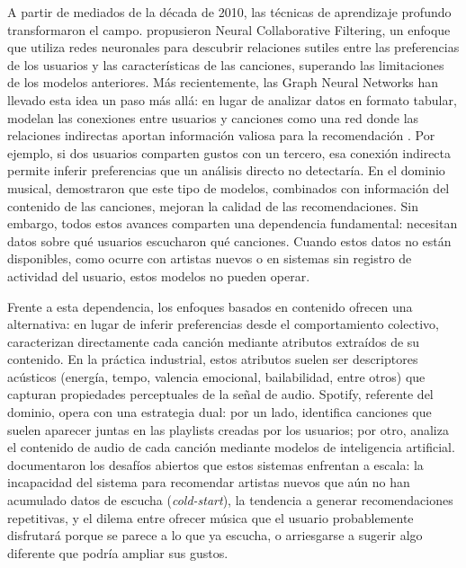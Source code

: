 A partir de mediados de la década de 2010, las técnicas de aprendizaje profundo transformaron el campo. \textcite{he_2017_ncf} propusieron Neural Collaborative Filtering, un enfoque que utiliza redes neuronales para descubrir relaciones sutiles entre las preferencias de los usuarios y las características de las canciones, superando las limitaciones de los modelos anteriores. Más recientemente, las Graph Neural Networks han llevado esta idea un paso más allá: en lugar de analizar datos en formato tabular, modelan las conexiones entre usuarios y canciones como una red donde las relaciones indirectas aportan información valiosa para la recomendación \parencite{wu_2023_gnn_recsys_survey}. Por ejemplo, si dos usuarios comparten gustos con un tercero, esa conexión indirecta permite inferir preferencias que un análisis directo no detectaría. En el dominio musical, \textcite{anelli_2024_hybrid_gnn_music} demostraron que este tipo de modelos, combinados con información del contenido de las canciones, mejoran la calidad de las recomendaciones. Sin embargo, todos estos avances comparten una dependencia fundamental: necesitan datos sobre qué usuarios escucharon qué canciones. Cuando estos datos no están disponibles, como ocurre con artistas nuevos o en sistemas sin registro de actividad del usuario, estos modelos no pueden operar.

Frente a esta dependencia, los enfoques basados en contenido ofrecen una alternativa: en lugar de inferir preferencias desde el comportamiento colectivo, caracterizan directamente cada canción mediante atributos extraídos de su contenido. En la práctica industrial, estos atributos suelen ser descriptores acústicos (energía, tempo, valencia emocional, bailabilidad, entre otros) que capturan propiedades perceptuales de la señal de audio. Spotify, referente del dominio, opera con una estrategia dual: por un lado, identifica canciones que suelen aparecer juntas en las playlists creadas por los usuarios; por otro, analiza el contenido de audio de cada canción mediante modelos de inteligencia artificial. \textcite{schedl_2018_challenges_mrs} documentaron los desafíos abiertos que estos sistemas enfrentan a escala: la incapacidad del sistema para recomendar artistas nuevos que aún no han acumulado datos de escucha (\textit{cold-start}), la tendencia a generar recomendaciones repetitivas, y el dilema entre ofrecer música que el usuario probablemente disfrutará porque se parece a lo que ya escucha, o arriesgarse a sugerir algo diferente que podría ampliar sus gustos.

